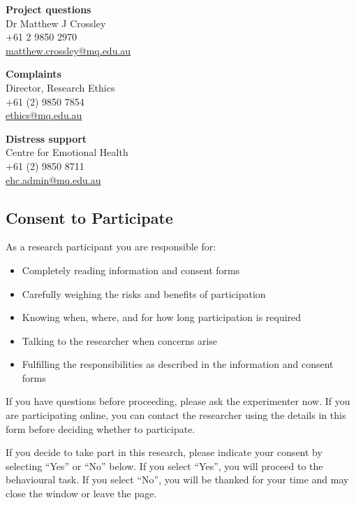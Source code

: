 \documentclass[letterpaper, 10pt]{article}
\let\oldsubsection\subsection
\renewcommand{\subsection}[1]{%
  \Needspace{10\baselineskip}%
  \oldsubsection{#1}%
}
\begin{document}
\vspace{0.5\baselineskip}
\noindent
\begin{minipage}[t]{0.31\textwidth}
\raggedright
\textbf{Project questions}\\[0.25\baselineskip]
Dr Matthew J Crossley\\
+61 2 9850 2970\\
\url{matthew.crossley@mq.edu.au}
\end{minipage}\hfill%
\begin{minipage}[t]{0.31\textwidth}
\raggedright
\textbf{Complaints}\\[0.25\baselineskip]
Director, Research Ethics\\
+61 (2) 9850 7854\\
\url{ethics@mq.edu.au}
\end{minipage}\hfill%
\begin{minipage}[t]{0.31\textwidth}
\raggedright
\textbf{Distress support}\\[0.25\baselineskip]
Centre for Emotional Health\\
+61 (2) 9850 8711\\
\url{ehc.admin@mq.edu.au}
\end{minipage}


\subsection{Consent to Participate}
As a research participant you are responsible for:

\begin{itemize}
\item Completely reading information and consent forms
\item Carefully weighing the risks and benefits of participation
\item Knowing when, where, and for how long participation is required
\item Talking to the researcher when concerns arise
\item Fulfilling the responsibilities as described in the information and consent forms
\end{itemize}

If you have questions before proceeding, please ask the
experimenter now. If you are participating online, you can
contact the researcher using the details in this form before
deciding whether to participate.

If you decide to take part in this research, please indicate
your consent by selecting ``Yes'' or ``No'' below. If you
select ``Yes'', you will proceed to the behavioural task. If
you select ``No'', you will be thanked for your time and may
close the window or leave the page.
\end{document}
